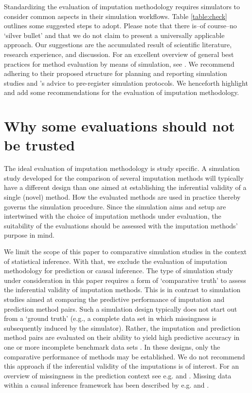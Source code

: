 \documentclass[bimj,fleqn]{w-art}
\begin{document}
Standardizing the evaluation of imputation methodology requires simulators to consider common aspects in their simulation workflows. Table \ref{table:check} outlines some suggested steps to adopt. Please note that there is--of course--no `silver bullet' and that we do not claim to present a universally applicable approach. Our suggestions are the accumulated result of scientific literature, research experience, and discussion. For an excellent overview of general best practices for method evaluation by means of simulation, see \citet{morr18}. We recommend adhering to their proposed structure for planning and reporting simulation studies and \citet{pawe22}'s advice to pre-register simulation protocols. We henceforth highlight and add some recommendations for the evaluation of imputation methodology. 


\section{Why some evaluations should not be trusted}


The ideal evaluation of imputation methodology is study specific. A simulation study developed for the comparison of several imputation methods will typically have a different design than one aimed at establishing the inferential validity of a single (novel) method. How the evaluated methods are used in practice thereby governs the simulation procedure. Since the simulation aims and setup are intertwined with the choice of imputation methods under evaluation, the suitability of the evaluations should be assessed with the imputation methods' purpose in mind. 

We limit the scope of this paper to comparative simulation studies in the context of statistical inference. With that, we exclude the evaluation of imputation methodology for prediction or causal inference. The type of simulation study under consideration in this paper requires a form of `comparative truth' to assess the inferential validity of imputation methods. This is in contrast to simulation studies aimed at comparing the predictive performance of imputation and prediction method pairs. Such a simulation design typically does not start out from a `ground truth' (e.g., a complete data set in which missingness is subsequently induced by the simulator). Rather, the imputation and prediction method pairs are evaluated on their ability to yield high predictive accuracy in one or more incomplete benchmark data sets \citep{liu21}. In these designs, only the comparative performance of methods may be established. We do not recommend this approach if the inferential validity of the imputations is of interest. For an overview of missingness in the prediction context see e.g. \citet{wood15} and \citet{sper20}. Missing data within a causal inference framework has been described by e.g. \cite{more18} and \cite{moha21}.
\end{document}
